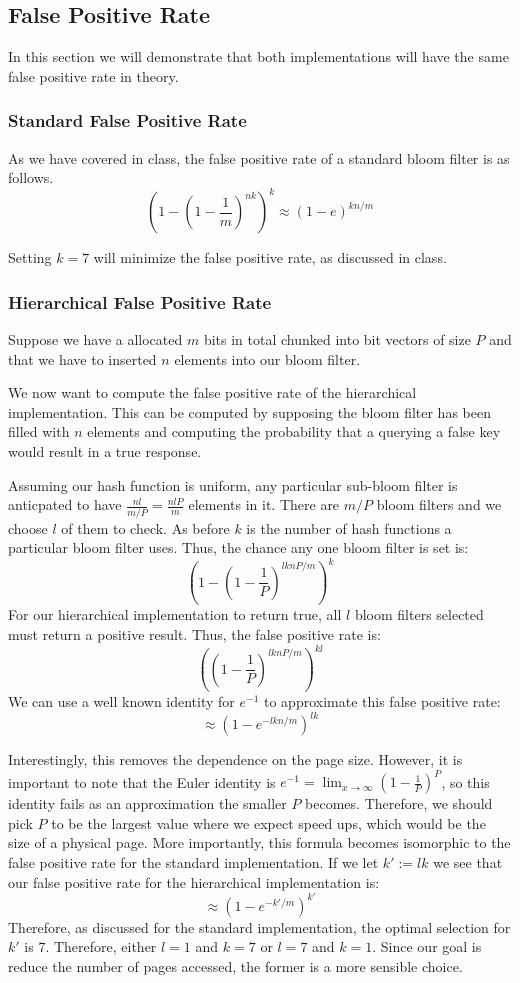 \subsection{False Positive Rate}

In this section we will demonstrate that both implementations will have the same false positive rate in theory.
\subsubsection{Standard False Positive Rate}

As we have covered in class, the false positive rate of a standard bloom filter is as follows.
\begin{equation}
    (1 - (1 - \frac{1}{m})^{nk})^k \approx (1  - e)^{kn/m}
\end{equation}

Setting $k=7$ will minimize the false positive rate, as discussed in class.

\subsubsection{Hierarchical False Positive Rate}
Suppose we have a allocated $m$ bits in total chunked into bit vectors of size $P$ and that we have to inserted $n$ elements into our bloom filter.

We now want to compute the false positive rate of the hierarchical implementation.
This can be computed by supposing the bloom filter has been filled with $n$ elements and computing the probability that a querying a false key would result in a true response.

Assuming our hash function is uniform, any particular sub-bloom filter is anticpated to have $\frac{nl}{m/P} = \frac{nlP}{m} $ elements in it.
There are $m/P$ bloom filters and we choose $l$ of them to check. As before $k$ is the number of hash functions a particular bloom filter uses.
Thus, the chance any one bloom filter is set is:
$$(1-(1 - \frac{1}{P})^{lknP/m})^k$$
For our hierarchical implementation to return true, all $l$ bloom filters selected must return a positive result.
Thus, the false positive rate is:
$$((1 - \frac{1}{P})^{lknP/m})^{kl}$$
We can use a well known identity for $e^{-1}$ to approximate this false positive rate:
$$\approx (1 - e^{-lkn/m})^{lk}$$

Interestingly, this removes the dependence on the page size.
However, it is important to note that the Euler identity is $e^{-1} = \lim_{x\rightarrow\infty}(1-\frac{1}{P})^P$, so this identity fails as an approximation the smaller $P$ becomes.
Therefore, we should pick $P$ to be the largest value where we expect speed ups, which would be the size of a physical page.
More importantly, this formula becomes isomorphic to the false positive rate for the standard implementation.
If we let $k' := lk$ we see that our false positive rate for the hierarchical implementation is:
$$\approx (1 - e^{-k'/m})^{k'}$$
Therefore, as discussed for the standard implementation, the optimal selection for $k'$ is $7$.
Therefore, either $l=1$ and $k=7$ or $l=7$ and $k=1$.
Since our goal is reduce the number of pages accessed, the former is a more sensible choice.

